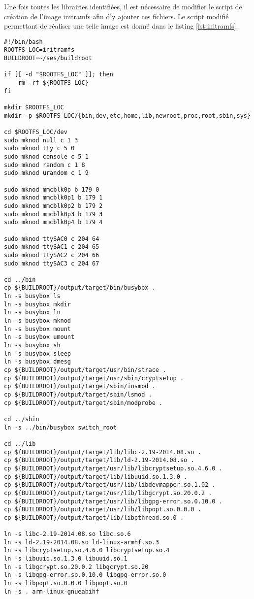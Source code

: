 Une fois toutes les librairies identifiées, il est nécessaire de modifier le script de création de l'image initramfs afin d'y ajouter ces fichiers. Le script modifié permettant de réaliser une telle image est donné dans le listing \ref{lst:initramfs}.
\begin{lstlisting}[label=lst:initramfs,caption=Génération de l'image initramfs]
#!/bin/bash
ROOTFS_LOC=initramfs
BUILDROOT=~/ses/buildroot

if [[ -d "$ROOTFS_LOC" ]]; then
	rm -rf ${ROOTFS_LOC}
fi

mkdir $ROOTFS_LOC
mkdir -p $ROOTFS_LOC/{bin,dev,etc,home,lib,newroot,proc,root,sbin,sys}

cd $ROOTFS_LOC/dev
sudo mknod null c 1 3
sudo mknod tty c 5 0
sudo mknod console c 5 1
sudo mknod random c 1 8
sudo mknod urandom c 1 9

sudo mknod mmcblk0p b 179 0
sudo mknod mmcblk0p1 b 179 1
sudo mknod mmcblk0p2 b 179 2
sudo mknod mmcblk0p3 b 179 3
sudo mknod mmcblk0p4 b 179 4

sudo mknod ttySAC0 c 204 64
sudo mknod ttySAC1 c 204 65
sudo mknod ttySAC2 c 204 66
sudo mknod ttySAC3 c 204 67

cd ../bin
cp ${BUILDROOT}/output/target/bin/busybox .
ln -s busybox ls
ln -s busybox mkdir
ln -s busybox ln
ln -s busybox mknod
ln -s busybox mount
ln -s busybox umount
ln -s busybox sh
ln -s busybox sleep
ln -s busybox dmesg
cp ${BUILDROOT}/output/target/usr/bin/strace .
cp ${BUILDROOT}/output/target/usr/sbin/cryptsetup .
cp ${BUILDROOT}/output/target/sbin/insmod .
cp ${BUILDROOT}/output/target/sbin/lsmod .
cp ${BUILDROOT}/output/target/sbin/modprobe .

cd ../sbin
ln -s ../bin/busybox switch_root

cd ../lib
cp ${BUILDROOT}/output/target/lib/libc-2.19-2014.08.so .
cp ${BUILDROOT}/output/target/lib/ld-2.19-2014.08.so .
cp ${BUILDROOT}/output/target/usr/lib/libcryptsetup.so.4.6.0 .
cp ${BUILDROOT}/output/target/lib/libuuid.so.1.3.0 .
cp ${BUILDROOT}/output/target/usr/lib/libdevmapper.so.1.02 .
cp ${BUILDROOT}/output/target/usr/lib/libgcrypt.so.20.0.2 .
cp ${BUILDROOT}/output/target/usr/lib/libgpg-error.so.0.10.0 .
cp ${BUILDROOT}/output/target/usr/lib/libpopt.so.0.0.0 .
cp ${BUILDROOT}/output/target/lib/libpthread.so.0 .

ln -s libc-2.19-2014.08.so libc.so.6
ln -s ld-2.19-2014.08.so ld-linux-armhf.so.3
ln -s libcryptsetup.so.4.6.0 libcryptsetup.so.4
ln -s libuuid.so.1.3.0 libuuid.so.1
ln -s libgcrypt.so.20.0.2 libgcrypt.so.20
ln -s libgpg-error.so.0.10.0 libgpg-error.so.0
ln -s libpopt.so.0.0.0 libpopt.so.0
ln -s . arm-linux-gnueabihf


\end{lstlisting}
